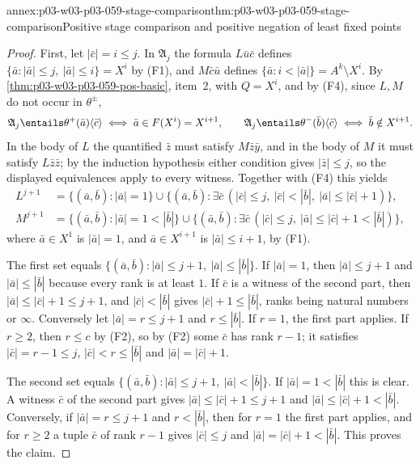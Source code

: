 \begin{annexitem}{annex:p03-w03-p03-059-stage-comparison}{thm:p03-w03-p03-059-stage-comparison}{Positive stage comparison and positive negation of least fixed points}
\begin{proof}
First, let \(|\bar c|=i\leq j\). In \(\mathfrak A_j\) the formula
\(L\bar u\bar c\) defines \(\{\bar a:|\bar a|\leq j,\ |\bar a|\leq i\}=X^i\)
by (F1), and \(M\bar c\bar u\) defines
\(\{\bar a:i<|\bar a|\}=A^k\setminus X^i\). By
\cref{thm:p03-w03-p03-059-pos-basic}, item~2, with \(Q=X^i\), and by
(F4), since \(L,M\) do not occur in \(\theta^\pm\),
\[
 \mathfrak A_j\entails\theta^+(\bar a)\langle\bar c\rangle\iff
 \bar a\in F(X^i)=X^{i+1},\qquad
 \mathfrak A_j\entails\theta^-(\bar b)\langle\bar c\rangle\iff
 \bar b\notin X^{i+1}.
\]
In the body of \(L\) the quantified \(\bar z\) must satisfy
\(M\bar z\bar y\), and in the body of \(M\) it must satisfy
\(L\bar z\bar z\); by the induction hypothesis either condition gives
\(|\bar z|\leq j\), so the displayed equivalences apply to every witness.
Together with (F4) this yields
\[
\begin{aligned}
 L^{j+1}&=\{(\bar a,\bar b):|\bar a|=1\}\cup
   \{(\bar a,\bar b):\exists\bar c\,(|\bar c|\leq j,\ |\bar c|<|\bar b|,\
   |\bar a|\leq|\bar c|+1)\},\\
 M^{j+1}&=\{(\bar a,\bar b):|\bar a|=1<|\bar b|\}\cup
   \{(\bar a,\bar b):\exists\bar c\,(|\bar c|\leq j,\
   |\bar a|\leq|\bar c|+1<|\bar b|)\},
\end{aligned}
\]
where \(\bar a\in X^1\) is \(|\bar a|=1\), and \(\bar a\in X^{i+1}\) is
\(|\bar a|\leq i+1\), by (F1).

The first set equals \(\{(\bar a,\bar b):|\bar a|\leq j+1,\
|\bar a|\leq|\bar b|\}\). If \(|\bar a|=1\), then \(|\bar a|\leq j+1\) and
\(|\bar a|\leq|\bar b|\) because every rank is at least \(1\). If
\(\bar c\) is a witness of the second part, then
\(|\bar a|\leq|\bar c|+1\leq j+1\), and \(|\bar c|<|\bar b|\) gives
\(|\bar c|+1\leq|\bar b|\), ranks being natural numbers or \(\infty\).
Conversely let \(|\bar a|=r\leq j+1\) and \(r\leq|\bar b|\). If \(r=1\),
the first part applies. If \(r\geq2\), then \(r\leq c\) by (F2), so by (F2)
some \(\bar c\) has rank \(r-1\); it satisfies \(|\bar c|=r-1\leq j\),
\(|\bar c|<r\leq|\bar b|\) and \(|\bar a|=|\bar c|+1\).

The second set equals \(\{(\bar a,\bar b):|\bar a|\leq j+1,\
|\bar a|<|\bar b|\}\). If \(|\bar a|=1<|\bar b|\) this is clear. A witness
\(\bar c\) of the second part gives \(|\bar a|\leq|\bar c|+1\leq j+1\) and
\(|\bar a|\leq|\bar c|+1<|\bar b|\). Conversely, if \(|\bar a|=r\leq j+1\)
and \(r<|\bar b|\), then for \(r=1\) the first part applies, and for
\(r\geq2\) a tuple \(\bar c\) of rank \(r-1\) gives \(|\bar c|\leq j\) and
\(|\bar a|=|\bar c|+1<|\bar b|\). This proves the claim.


\end{proof}
\end{annexitem}
